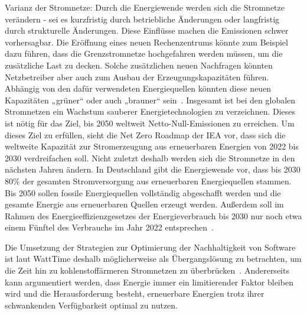 %
%

Varianz der Stromnetze: Durch die Energiewende werden sich die Stromnetze verändern - sei es kurzfristig durch betriebliche Änderungen oder langfristig durch strukturelle Änderungen.
Diese Einflüsse machen die Emissionen schwer vorhersagbar.
Die Eröffnung eines neuen Rechenzentrums könnte zum Beispiel dazu führen, dass die Grenzstromnetze hochgefahren werden müssen, um die zusätzliche Last zu decken.
Solche zusätzlichen neuen Nachfragen könnten Netzbetreiber aber auch zum Ausbau der Erzeugungskapazitäten führen.
Abhängig von den dafür verwendeten Energiequellen könnten diese neuen Kapazitäten „grüner“ oder auch „brauner“ sein~\cite{WattTime.2022}.
Insgesamt ist bei den globalen Stromnetzen ein Wachstum sauberer Energietechnologien zu verzeichnen.
Dieses ist nötig für das Ziel, bis 2050 weltweit Netto-Null-Emissionen zu erreichen.
Um dieses Ziel zu erfüllen, sieht die Net Zero Roadmap der IEA vor, dass sich die weltweite Kapazität zur Stromerzeugung aus erneuerbaren Energien von 2022 bis 2030 verdreifachen soll.
Nicht zuletzt deshalb werden sich die Stromnetze in den nächsten Jahren ändern.
In Deutschland gibt die Energiewende vor, dass bis 2030 80\% der gesamten Stromversorgung aus erneuerbaren Energiequellen stammen.
Bis 2050 sollen fossile Energiequellen vollständig abgeschafft werden und die gesamte Energie aus erneuerbaren Quellen erzeugt werden.
Außerdem soll im Rahmen des Energieeffizienzgesetzes der Energieverbrauch bis 2030 nur noch etwa einem Fünftel des Verbrauchs im Jahr 2022 entsprechen~\cite{InternationalEnergyAgengy.2023}.

Die Umsetzung der Strategien zur Optimierung der Nachhaltigkeit von Software ist laut WattTime deshalb möglicherweise als Übergangslösung zu betrachten, um die Zeit hin zu kohlenstoffärmeren Stromnetzen zu überbrücken~\cite{WattTime.12.3.2024}.
Andererseits kann argumentiert werden, dass Energie immer ein limitierender Faktor bleiben wird und die Herausforderung besteht, erneuerbare Energien trotz ihrer schwankenden Verfügbarkeit optimal zu nutzen.

